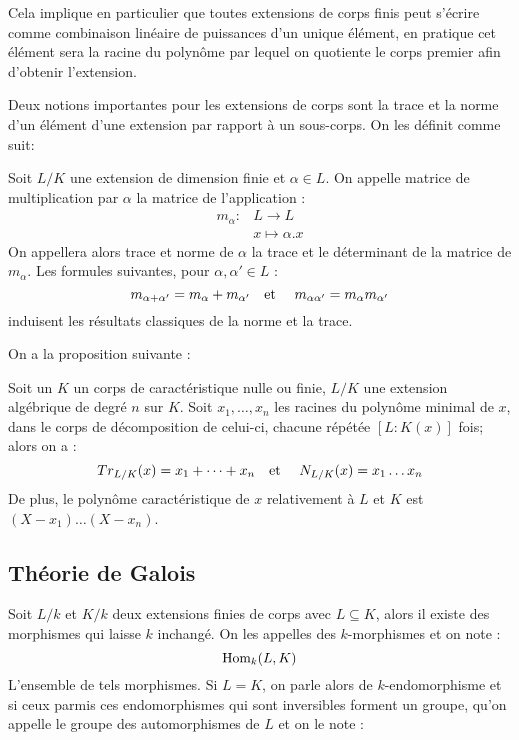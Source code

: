 \documentclass[a4paper]{article} %
\numberwithin{section}{part}
\numberwithin{equation}{section}
\newcommand\etmath{\textup{\quad et \quad}}
\begin{document}
Cela implique en particulier que toutes extensions de corps finis peut s'écrire
comme combinaison linéaire de puissances d'un unique élément, en pratique cet
élément sera la racine du polynôme par lequel on quotiente le corps premier afin
d'obtenir l'extension.
\vspace{0.3cm}

Deux notions importantes pour les extensions de corps sont la trace et la norme
d'un élément d'une extension par rapport à un sous-corps. On les définit comme
suit:

\begin{defn}
Soit $L/K$ une extension de dimension finie et $\alpha\in L$. On appelle matrice
de multiplication par $\alpha$ la matrice de l'application :
\begin{align*}
m_{\alpha} :&L \longrightarrow L\\
&x\longmapsto\alpha.x
\end{align*}
On appellera alors trace et norme de $\alpha$ la trace et le déterminant 
de la matrice de $m_{\alpha}$. Les formules suivantes, pour $\alpha, \alpha'\in
L$ :
\[ m_{\alpha + \alpha'} = m_{\alpha} + m_{\alpha'} \etmath
m_{\alpha\alpha'} = m_{\alpha}m_{\alpha'}\]
induisent les résultats classiques de la norme et la trace.
\end{defn}

On a la proposition suivante :

\begin{prop}
Soit un $K$ un corps de caractéristique nulle ou finie, $L/K$ une extension
algébrique de degré $n$ sur $K$. Soit 
$x_1,\dots, x_n$ les racines du polynôme minimal de $x$, dans le corps de
décomposition de celui-ci, chacune répétée $[L:K(x)]$ fois; alors on a :
\[Tr_{L/K}(x) = x_1 + \dots + x_n \etmath N_{L/K}(x) = x_1\dots x_n\]
De plus, le polynôme caractéristique de $x$ relativement à $L$ et $K$ est $(X -
x_1)\dots(X - x_n)$.
\end{prop}

\subsection{Théorie de Galois}
Soit $L/k$ et $K/k$ deux extensions finies de corps avec $L\subseteq K$, alors 
il existe des morphismes qui laisse $k$ inchangé. On les appelles des 
$k$-morphismes et on note :
\[\textup{Hom}_k(L, K)\]
L'ensemble de tels morphismes. Si $L = K$, on parle alors de $k$-endomorphisme
et si ceux parmis ces endomorphismes qui sont inversibles forment un groupe,
qu'on appelle le groupe des automorphismes de $L$ et on le note :
\end{document}
